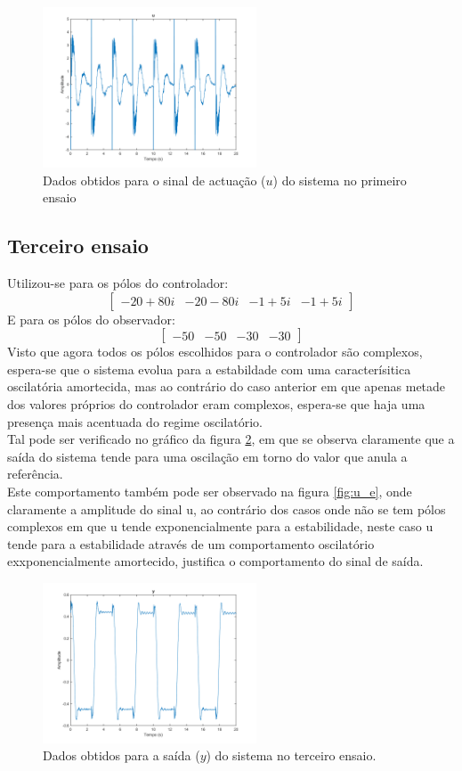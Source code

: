 \documentclass[%
  reprint,
  nofootinbib,
  amsmath,amssymb,
  aps,
  10pt,
  a4paper
]{revtex4-1}
\begin{document}
\begin{figure}
\includegraphics[width=2.5in]{../imgs/dados_00_c/dados_00_c_u.png}
\caption{Dados obtidos para o sinal de actuação ($u$) do sistema no primeiro ensaio}
\label{fig:u_seg}
\end{figure}
\subsection{Terceiro ensaio}
Utilizou-se para os pólos do controlador:
\begin{equation}
\begin{bmatrix}
-20+80i & -20-80i  & -1+5i &-1+5i
\end{bmatrix}
\end{equation}
E para os pólos do observador:
\begin{equation}
\begin{bmatrix}
-50 & -50  & -30 &-30
\end{bmatrix}
\end{equation}
Visto que agora todos os pólos escolhidos para o controlador são complexos, espera-se que o sistema evolua para a estabildade com uma caracterísitica oscilatória amortecida, mas  ao contrário do caso anterior em que apenas metade dos valores próprios do controlador eram complexos, espera-se que haja uma presença mais acentuada do regime oscilatório.\\
Tal pode ser verificado no gráfico da figura \ref{fig:y_e}, em que se observa claramente que a saída do sistema tende para uma oscilação em torno do valor que anula a referência.\\
Este comportamento também pode ser observado na figura \ref{fig:u_e}, onde claramente a amplitude do sinal u, ao contrário dos casos onde não se tem pólos complexos em que u tende exponencialmente para a estabilidade, neste caso u tende para a estabilidade através de um comportamento oscilatório exxponencialmente amortecido, justifica o comportamento do sinal de saída.
\begin{figure}
\includegraphics[width=2.5in]{../imgs/dados_00_e/dados_00_e_y.png}
\caption{Dados obtidos para a saída ($y$) do sistema no terceiro ensaio.}
\label{fig:y_e}
\end{figure}
\end{document}
